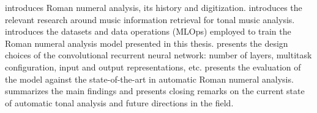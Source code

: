 
introduces Roman numeral analysis, its history and
digitization.  introduces the relevant
research around music information retrieval for tonal music
analysis.  introduces
the datasets and data operations (MLOps) employed to train
the Roman numeral analysis model presented in this thesis.
 presents the design choices of the
convolutional recurrent neural network: number of layers,
multitask configuration, input and output representations,
etc.  presents the
evaluation of the model against the state-of-the-art in
automatic Roman numeral analysis. 
summarizes the main findings and presents closing remarks on
the current state of automatic tonal analysis and future
directions in the field.
